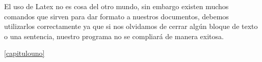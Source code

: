 \documentclass[12pt]{report}
\begin{document}
El uso de Latex no es cosa del otro mundo, sin embargo existen muchos comandos que sirven para dar formato a nuestros documentos, debemos utilizarlos correctamente ya que si nos olvidamos de cerrar algún bloque de texto o una sentencia, nuestro programa no se compliará de manera exitosa.
\newline
\newline
\newline
\newline
\newline
\newline
\newline
\newline
\newline
\newline
\newline
\newline
\newline
\newline
\newline
\newline
\newline
\newline
\newline
\newline
\newline
\newline
\newline
\newline
\newline
\newline
\newline
\newline

 \ref{capitulouno}
\end{document}
